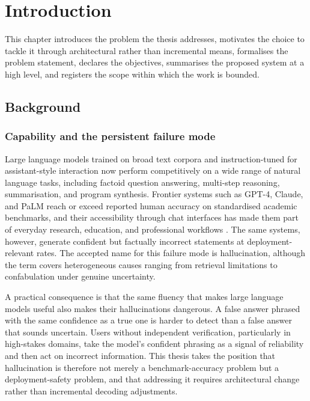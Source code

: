 \chapter{Introduction}
\label{ch:introduction}

This chapter introduces the problem the thesis addresses, motivates the choice to tackle it through architectural rather than incremental means, formalises the problem statement, declares the objectives, summarises the proposed system at a high level, and registers the scope within which the work is bounded.

\section{Background}
\label{sec:background}

\subsection{Capability and the persistent failure mode}
\label{sec:cap-failure}

Large language models trained on broad text corpora and instruction-tuned for assistant-style interaction now perform competitively on a wide range of natural language tasks, including factoid question answering, multi-step reasoning, summarisation, and program synthesis. Frontier systems such as GPT-4, Claude, and PaLM reach or exceed reported human accuracy on standardised academic benchmarks, and their accessibility through chat interfaces has made them part of everyday research, education, and professional workflows \cite{openai2023gpt4, anthropic2023claude, anil2023palm}. The same systems, however, generate confident but factually incorrect statements at deployment-relevant rates. The accepted name for this failure mode is hallucination, although the term covers heterogeneous causes ranging from retrieval limitations to confabulation under genuine uncertainty.

A practical consequence is that the same fluency that makes large language models useful also makes their hallucinations dangerous. A false answer phrased with the same confidence as a true one is harder to detect than a false answer that sounds uncertain. Users without independent verification, particularly in high-stakes domains, take the model's confident phrasing as a signal of reliability and then act on incorrect information. This thesis takes the position that hallucination is therefore not merely a benchmark-accuracy problem but a deployment-safety problem, and that addressing it requires architectural change rather than incremental decoding adjustments.

